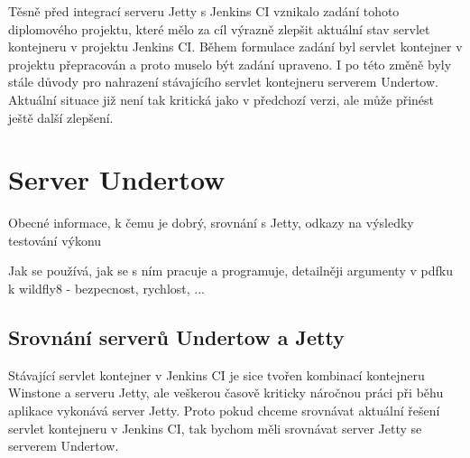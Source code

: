         
        \medskip
        Těsně před integrací serveru Jetty s Jenkins CI
        vznikalo zadání tohoto diplomového projektu, které mělo za cíl
        výrazně zlepšit aktuální stav servlet kontejneru v projektu Jenkins CI. Během
        formulace zadání byl servlet kontejner v projektu přepracován a proto
        muselo být zadání upraveno. I po této změně byly stále důvody pro 
        nahrazení stávajícího servlet kontejneru serverem Undertow.
        Aktuální situace již není tak kritická jako v předchozí verzi,
        ale může přinést ještě další zlepšení.
                

    \section{Server Undertow} \label{undertow}
        Obecné informace, k čemu je dobrý, srovnání s Jetty, odkazy na výsledky testování výkonu

        Jak se používá, jak se s ním pracuje a programuje, detailněji
         argumenty v pdfku k wildfly8 - bezpecnost, rychlost, ...
        \cite{undertowWeb}

        \subsection{Srovnání serverů Undertow a Jetty}\label{srovnani}
            Stávající servlet kontejner v Jenkins CI je sice tvořen
            kombinací kontejneru Winstone a serveru Jetty, ale veškerou
            časově kriticky náročnou práci při běhu aplikace vykonává server
            Jetty. Proto pokud chceme srovnávat aktuální řešení servlet kontejneru
            v Jenkins CI, tak bychom měli srovnávat server Jetty se serverem Undertow.

